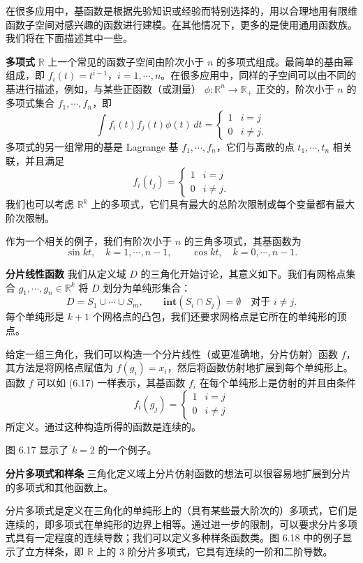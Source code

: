 \documentclass[UTF8, 12pt, fontset=fandol, oneside]{ctexart}
\begin{document}
在很多应用中，基函数是根据先验知识或经验而特别选择的，用以合理地用有限维函数子空间对感兴趣的函数进行建模。在其他情况下，更多的是使用通用函数族。我们将在下面描述其中一些。

\noindent\textbf{多项式}\quad
$\mathbb{R}$ 上一个常见的函数子空间由阶次小于 $n$ 的多项式组成。最简单的基由幂组成，即 $f_i(t)=t^{i-1}$，$i=1,\cdots,n$。在很多应用中，同样的子空间可以由不同的基进行描述，例如，与某些正函数（或测量） $\phi:\mathbb{R}^n\to\mathbb{R}_+$ 正交的，阶次小于 $n$ 的多项式集合 $f_1,\cdots,f_n$，即
\[
\int f_i(t)f_j(t)\phi(t)\,dt=
\begin{cases}
1 & i=j\\
0 & i\neq j.
\end{cases}
\]
多项式的另一组常用的基是 Lagrange 基 $f_1,\cdots,f_n$，它们与离散的点 $t_1,\cdots,t_n$ 相关联，并且满足
\[
f_i(t_j)=
\begin{cases}
1 & i=j\\
0 & i\neq j.
\end{cases}
\]
我们也可以考虑 $\mathbb{R}^k$ 上的多项式，它们具有最大的总阶次限制或每个变量都有最大阶次限制。

作为一个相关的例子，我们有阶次小于 $n$ 的三角多项式，其基函数为
\[
\sin kt,\quad k=1,\cdots,n-1,\qquad \cos kt,\quad k=0,\cdots,n-1.
\]

\noindent\textbf{分片线性函数}\quad
我们从定义域 $D$ 的三角化开始讨论，其意义如下。我们有网格点集合 $g_1,\cdots,g_n\in\mathbb{R}^k$ 将 $D$ 划分为单纯形集合：
\[
D=S_1\cup\cdots\cup S_m,\qquad \mathbf{int}(S_i\cap S_j)=\emptyset \quad \text{对于 } i\neq j.
\]
每个单纯形是 $k+1$ 个网格点的凸包，我们还要求网格点是它所在的单纯形的顶点。

给定一组三角化，我们可以构造一个分片线性（或更准确地，分片仿射）函数 $f$，其方法是将网格点赋值为 $f(g_i)=x_i$，然后将函数仿射地扩展到每个单纯形上。函数 $f$ 可以如 (6.17) 一样表示，其基函数 $f_i$ 在每个单纯形上是仿射的并且由条件
\[
f_i(g_j)=
\begin{cases}
1 & i=j\\
0 & i\neq j
\end{cases}
\]
所定义。通过这种构造所得的函数是连续的。

图 6.17 显示了 $k=2$ 的一个例子。

\noindent\textbf{分片多项式和样条}\quad
三角化定义域上分片仿射函数的想法可以很容易地扩展到分片的多项式和其他函数上。

分片多项式是定义在三角化的单纯形上的（具有某些最大阶次的）多项式，它们是连续的，即多项式在单纯形的边界上相等。通过进一步的限制，可以要求分片多项式具有一定程度的连续导数；我们可以定义多种样条函数类。图 6.18 中的例子显示了立方样条，即 $\mathbb{R}$ 上的 3 阶分片多项式，它具有连续的一阶和二阶导数。
\end{document}

